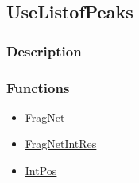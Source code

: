 \subsection{UseListofPeaks}\label{UseListofPeaks}
\subsubsection{Description}


\subsubsection{Functions}
\begin{itemize}
\item \hyperref[FragNet]{FragNet}
\item \hyperref[FragNetIntRes]{FragNetIntRes}
\item \hyperref[IntPos]{IntPos}
\end{itemize}


